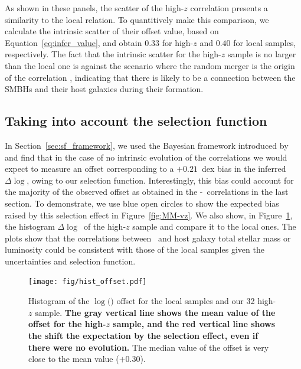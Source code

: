 \documentclass[apj]{emulateapj}
\begin{document}
As shown in these panels, the scatter of the high-$z$ correlation presents a similarity to the local relation. To quantitively make this comparison, we calculate the intrinsic scatter of their offset value, based on Equation~\ref{eq:infer_value}, and obtain $0.33$ for high-$z$ and $0.40$ for local samples, respectively. The fact that the intrinsic scatter for the high-$z$ sample is no larger than the local one is against the scenario where the random merger is the origin of the correlation \citep{Peng2007}, indicating that there is likely to be a connection between the SMBHs and their host galaxies during their formation.

\subsection{Taking into account the selection function}
\label{select_eff}

In Section~\ref{sec:sf_framework}, we used the Bayesian framework introduced by \citet{Schulze2011} and find that in the case of no intrinsic evolution of the correlations we would expect to measure an offset corresponding to a $+0.21$~dex bias in the inferred $\Delta \log$\mbh, owing to our selection function. Interestingly, this bias could account for the majority of the observed offset as obtained in the \mbh-\smass\ correlations in the last section. %
To demonstrate, we use blue open circles to show the expected bias raised by this selection effect in Figure~\ref{fig:MM-vz}. We also show, in Figure~\ref{fig:offset_hist}, the histogram $\Delta \log$\mbh\ of the high-$z$ sample and compare it to the local ones. 
The plots show that the correlations between \mbh\ and host galaxy total stellar mass or luminosity could be consistent with those of the local samples given the uncertainties and selection function.


\begin{figure}
\centering
{
\texttt{[image: fig/hist\_offset.pdf]}
}
\caption{\label{fig:offset_hist} 
Histogram of the $\log($\mbh$)$ offset for the local samples and our 32 high-$z$ sample. {\bf The gray vertical line shows the mean value of the offset for the high-$z$ sample, and the red vertical line shows the shift the expectation by the selection effect, even if there were no evolution.} The median value of the offset is very close to the mean value ($+0.30$).
}
\end{figure} 
\end{document}
